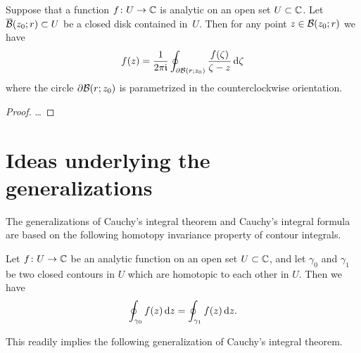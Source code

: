 \begin{corollary}
  \label{cor:cauchy_formula_circle}
  Suppose that a function $f \colon U \to \bC$ is analytic on an open
  set $U \subset \bC$.
  Let $\CDiskRC{r}{z_0} \subset U$ be a closed disk contained in~$U$.
  Then for any point $z \in \DiskRC{r}{z_0}$ we have
  \begin{align*}
    f(z) = \frac{1}{2\pi \ii}
        \oint_{\bdry \DiskRC{z_0}{r}} \frac{f(\zeta)}{\zeta - z} \, \ud \zeta
  \end{align*}
  where the circle $\bdry \DiskRC{z_0}{r}$ is parametrized in the
  counterclockwise orientation.
\end{corollary}
\begin{proof}
  \ldots
\end{proof}



\section{Ideas underlying the generalizations}

The generalizations of Cauchy's integral theorem and Cauchy's integral
formula are based on the following homotopy invariance property of
contour integrals.

\begin{lemma}
  \label{lem:homotopy_invariance}
  Let $f \colon U \to \bC$ be an analytic function on an open
  set $U \subset \bC$, and let $\gamma_0$ and $\gamma_1$ be two
  closed contours in $U$ which are homotopic to each other in $U$.
  Then we have
  \begin{align*}
    \oint_{\gamma_0} f(z) \, \ud z = \oint_{\gamma_1} f(z) \, \ud z .
  \end{align*}
\end{lemma}

This readily implies the following generalization of Cauchy's integral
theorem.


